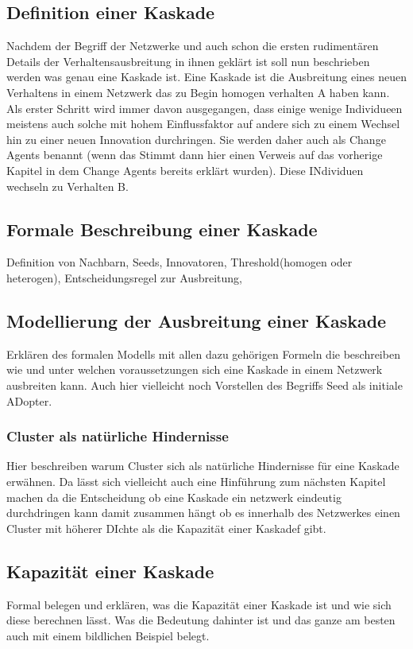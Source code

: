 \documentclass[12pt]{article}
\begin{document}
\subsection{Definition einer Kaskade}
Nachdem der Begriff der Netzwerke und auch schon die ersten rudimentären Details der Verhaltensausbreitung in ihnen geklärt ist soll nun beschrieben werden was genau eine Kaskade ist. Eine Kaskade ist die Ausbreitung eines neuen Verhaltens in einem Netzwerk das zu Begin homogen verhalten A haben kann. Als erster Schritt wird immer davon ausgegangen, dass einige wenige Individueen meistens auch solche mit hohem Einflussfaktor auf andere sich zu einem Wechsel hin zu einer neuen Innovation durchringen. Sie werden daher auch als Change Agents benannt (wenn das Stimmt dann hier einen Verweis auf das vorherige Kapitel in dem Change Agents bereits erklärt wurden). Diese INdividuen wechseln zu Verhalten B.
\subsection{Formale Beschreibung einer Kaskade}
Definition von Nachbarn, Seeds, Innovatoren, Threshold(homogen oder heterogen), Entscheidungsregel zur Ausbreitung, 
\subsection{Modellierung der Ausbreitung einer Kaskade}
Erklären des formalen Modells mit allen dazu gehörigen Formeln die beschreiben wie und unter welchen voraussetzungen sich eine Kaskade in einem Netzwerk ausbreiten kann. Auch hier vielleicht noch Vorstellen des Begriffs Seed als initiale ADopter.
\subsubsection{Cluster als natürliche Hindernisse}
Hier beschreiben warum Cluster sich als natürliche Hindernisse für eine Kaskade erwähnen. Da lässt sich vielleicht auch eine Hinführung zum nächsten Kapitel machen da die Entscheidung ob eine Kaskade ein netzwerk eindeutig durchdringen kann damit zusammen hängt ob es innerhalb des Netzwerkes einen Cluster mit höherer DIchte als die Kapazität einer Kaskadef gibt.
\subsection{Kapazität einer Kaskade}
Formal belegen und erklären, was die Kapazität einer Kaskade ist und wie sich diese berechnen lässt. Was die Bedeutung dahinter ist und das ganze am besten auch mit einem bildlichen Beispiel belegt.
\end{document}
